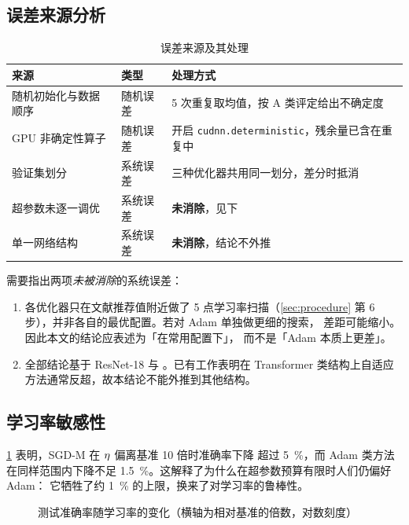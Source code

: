 \subsection{误差来源分析}
\label{sec:analysis:error}

\begin{table}[htbp]
  \centering
  \caption{误差来源及其处理}
  \label{tab:error}
  \begin{tabular}{lll}
    \toprule
    {来源} & {类型} & {处理方式} \\
    \midrule
    随机初始化与数据顺序 & 随机误差 & 5 次重复取均值，按 A 类评定给出不确定度 \\
    GPU 非确定性算子     & 随机误差 & 开启 \lstinline|cudnn.deterministic|，残余量已含在重复中 \\
    验证集划分           & 系统误差 & 三种优化器共用同一划分，差分时抵消 \\
    超参数未逐一调优     & 系统误差 & \textbf{未消除}，见下 \\
    单一网络结构         & 系统误差 & \textbf{未消除}，结论不外推 \\
    \bottomrule
  \end{tabular}
\end{table}

需要指出两项\emph{未被消除}的系统误差：

\begin{enumerate}
  \item 各优化器只在文献推荐值附近做了 5 点学习率扫描（\cref{sec:procedure}
        第 6 步），并非各自的最优配置。若对 Adam 单独做更细的搜索，
        差距可能缩小。因此本文的结论应表述为「在常用配置下」，
        而不是「Adam 本质上更差」。

  \item 全部结论基于 ResNet-18 与 \dataset{}。已有工作表明在 Transformer
        类结构上自适应方法通常反超，故本结论不能外推到其他结构。
\end{enumerate}

\subsection{学习率敏感性}
\label{sec:analysis:lr}

\cref{fig:lr-sweep} 表明，SGD-M 在 $\eta$ 偏离基准 10 倍时准确率下降
超过 \qty{5}{\percent}，而 Adam 类方法在同样范围内下降不足
\qty{1.5}{\percent}。这解释了为什么在超参数预算有限时人们仍偏好 Adam：
它牺牲了约 \qty{1}{\percent} 的上限，换来了对学习率的鲁棒性。

\begin{figure}[htbp]
  \centering
  \caption{测试准确率随学习率的变化（横轴为相对基准的倍数，对数刻度）}
  \label{fig:lr-sweep}
\end{figure}
